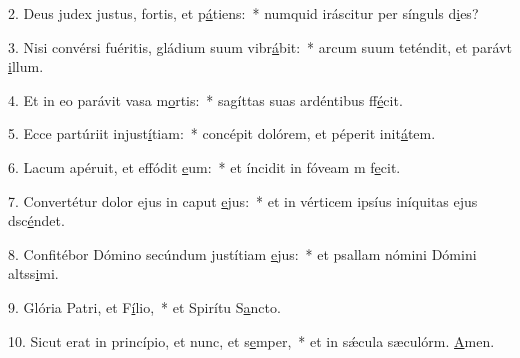 2. Deus judex justus, fortis, et p\uline{á}tiens:~* numquid iráscitur per sínguls d\uline{i}es?\par 
3. Nisi convérsi fuéritis, gládium suum vibr\uline{á}bit:~* arcum suum teténdit, et parávt \uline{i}llum.\par 
4. Et in eo parávit vasa m\uline{o}rtis:~* sagíttas suas ardéntibus ff\uline{é}cit.\par 
5. Ecce partúriit injust\uline{í}tiam:~* concépit dolórem, et péperit init\uline{á}tem.\par 
6. Lacum apéruit, et effódit \uline{e}um:~* et íncidit in fóveam m f\uline{e}cit.\par 
7. Convertétur dolor ejus in caput \uline{e}jus:~* et in vérticem ipsíus iníquitas ejus dsc\uline{é}ndet.\par 
8. Confitébor Dómino secúndum justítiam \uline{e}jus:~* et psallam nómini Dómini altss\uline{i}mi.\par 
9. Glória Patri, et F\uline{í}lio,~* et Spirítu S\uline{a}ncto.\par 
10. Sicut erat in princípio, et nunc, et s\uline{e}mper,~* et in sǽcula sæculórm. \uline{A}men.\par 
